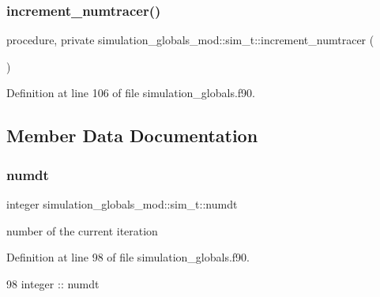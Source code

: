 \subsubsection{\texorpdfstring{increment\+\_\+numtracer()}{increment\_numtracer()}}
{\footnotesize\ttfamily procedure, private simulation\+\_\+globals\+\_\+mod\+::sim\+\_\+t\+::increment\+\_\+numtracer (\begin{DoxyParamCaption}{ }\end{DoxyParamCaption})\hspace{0.3cm}{\ttfamily [private]}}



Definition at line 106 of file simulation\+\_\+globals.\+f90.



\subsection{Member Data Documentation}
\mbox{\label{structsimulation__globals__mod_1_1sim__t_a6b7422e557c64c2319637600d79dd3cf}} 
\subsubsection{\texorpdfstring{numdt}{numdt}}
{\footnotesize\ttfamily integer simulation\+\_\+globals\+\_\+mod\+::sim\+\_\+t\+::numdt\hspace{0.3cm}{\ttfamily [private]}}



number of the current iteration 



Definition at line 98 of file simulation\+\_\+globals.\+f90.


\begin{DoxyCode}
98         \textcolor{keywordtype}{integer} :: numdt
\end{DoxyCode}
\mbox{\label{structsimulation__globals__mod_1_1sim__t_aab4a954c69a70668421f4071cbc07896}} 

